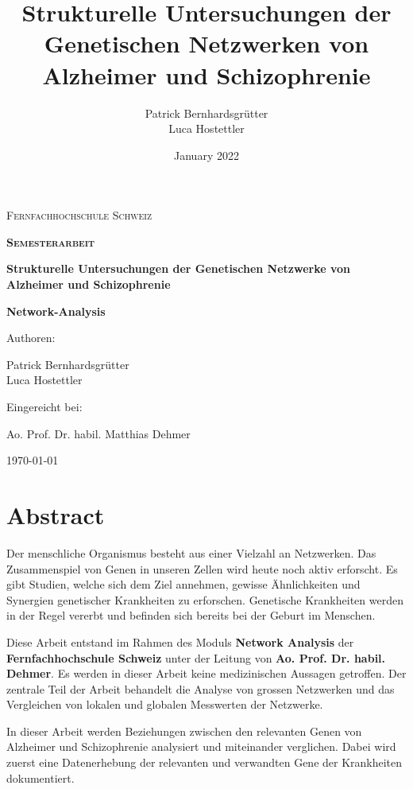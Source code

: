 \documentclass{article}
\title{Strukturelle Untersuchungen der Genetischen Netzwerken von Alzheimer und Schizophrenie}
\author{Patrick Bernhardsgrütter \\ Luca Hostettler}
\date{January 2022}
\begin{document}
\begin{titlepage}
  \centering
  \par\vspace{1cm}
  \linespread{1}\Large{\scshape Fernfachhochschule Schweiz\par}
  \vspace{1.5cm}
  {\scshape\Large\bfseries Semesterarbeit\par}
  {\huge\bfseries Strukturelle Untersuchungen der Genetischen Netzwerke von Alzheimer und Schizophrenie \par
    \Large\bfseries Network-Analysis\par}
  \vspace{1.5cm}
  \linespread{0.75}\large{Authoren:\par
    \linespread{0.75}\Large Patrick Bernhardsgrütter \\ Luca Hostettler }
  \vfill
  \linespread{0.75}\large{Eingereicht bei:\par
    Ao. Prof. Dr. habil. Matthias Dehmer}
  \vfill
  {\large \today \par}
\end{titlepage}

\newpage


\section*{Abstract}

Der menschliche Organismus besteht aus einer Vielzahl an Netzwerken. Das Zusammenspiel von Genen in unseren Zellen wird heute noch aktiv erforscht. Es gibt Studien, welche sich dem Ziel annehmen, gewisse Ähnlichkeiten und Synergien genetischer Krankheiten zu erforschen.
Genetische Krankheiten werden in der Regel vererbt und befinden sich bereits bei der Geburt im Menschen.

Diese Arbeit entstand im Rahmen des Moduls \textbf{Network Analysis} der \textbf{Fernfachhochschule Schweiz} unter der Leitung von \textbf{Ao. Prof. Dr. habil. Dehmer}. Es werden in dieser Arbeit keine medizinischen Aussagen getroffen. Der zentrale Teil der Arbeit behandelt die Analyse von grossen Netzwerken und das Vergleichen von lokalen und globalen Messwerten der Netzwerke.

In dieser Arbeit werden Beziehungen zwischen den relevanten Genen von Alzheimer und Schizophrenie analysiert und miteinander verglichen.
Dabei wird zuerst eine Datenerhebung der relevanten und verwandten Gene der Krankheiten dokumentiert.
\end{document}
